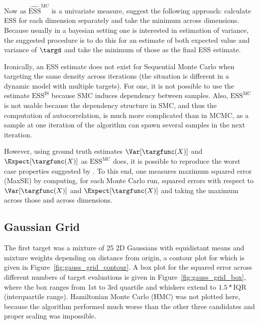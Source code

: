 Now as $\widehat{\textrm{ESS}}^\textrm{MC}$ is a univariate measure, \cite{Girolami2011,Hoffman2014} suggest the following approach: calculate ESS for each dimension separately and take the minimum across dimensions. Because usually in a bayesian setting one is interested in estimation of variance, the suggested procedure is to do this for an estimate of both expected value and variance of $\targd$ and take the minimum of those as the final ESS estimate.

Ironically, an ESS estimate does not exist for Sequential Monte Carlo when targeting the same density across iterations (the situation is different in a dynamic model with multiple targets). For one, it is not possible to use the estimate $\textrm{ESS}^\textrm{IS}$ because SMC induces dependency between samples. Also, $\textrm{ESS}^\textrm{MC}$ is not usable because the dependency structure in SMC, and thus the computation of autocorrelation, is much more complicated than in MCMC, as a sample at one iteration of the algorithm can spawn several samples in the next iteration.

However, using ground truth estimates $\Var[\targfunc(X)]$ and $\Expect[\targfunc(X)]$ as $\textrm{ESS}^\textrm{MC}$ does, it is possible to reproduce the worst case properties suggested by \cite{Girolami2011,Hoffman2014}. To this end, one measures maximum squared error (MaxSE) by computing, for each Monte Carlo run, squared errors with respect to $\Var[\targfunc(X)]$ and $\Expect[\targfunc(X)]$  and taking the maximum across those and across dimensions.


\subsection{Gaussian Grid}
The first target was a mixture of 25 2D Gaussians with equidistant means and mixture weights depending on distance from origin, a contour plot for which is given in Figure~\ref{fig:gauss_grid_contour}. A box plot for the squared error across different numbers of target evaluations is given in Figure~\ref{fig:gauss_grid_box}, where the box ranges from 1st to 3rd quartile and whiskers extend to $1.5*\textrm{IQR}$  (interquartile range). Hamiltonian Monte Carlo (HMC) was not plotted here, because the algorithm performed much worse than the other three candidates and proper scaling was impossible.

